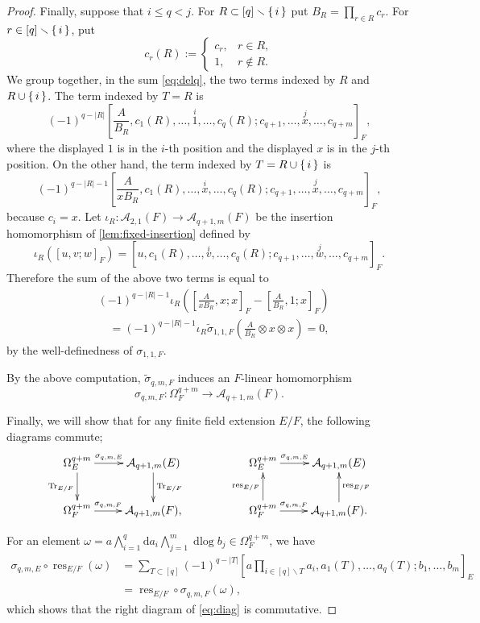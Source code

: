 \documentclass[a4paper,12pt,reqno]{amsart}
\numberwithin{equation}{section}
\theoremstyle{definition}
\DeclareMathOperator{\dlog}{dlog}
\DeclareMathOperator{\res}{res}
\DeclareMathOperator{\Tr}{Tr}
\renewcommand{\d}{\mathrm{d}}
\newcommand{\Acal}{\mathcal{A}}
\begin{document}
\begin{proof}
    Finally, suppose that $i\leq q<j$. 
    For $R\subset[q]\smallsetminus\set{i}$ put
	$B_R=\prod_{r\in R}c_r$.  
	For $r\in[q]\smallsetminus\set{i}$, put
\[
 c_r(R):=
 \begin{cases}
 c_r,&r\in R,\\
 1,&r\notin R.
 \end{cases}
\]
We group together, in the sum \eqref{eq:delq}, the two terms
indexed by
 $R$ and $R\cup \set{i}$.
The term indexed by $T=R$ is
\[
 (-1)^{q-|R|}
 \left[
 \frac{A}{B_R},
 c_1(R),\ldots,\overset{i}{1},\ldots,c_q(R);
 c_{q+1},\ldots,\overset{j}{x},\ldots,c_{q+m}
 \right]_F,
\]
where the displayed $1$ is in the $i$-th position and the
displayed $x$ is in the $j$-th position.
On the other hand, the term indexed by
$T=R\cup\set{i}$ is
\[
 (-1)^{q-|R|-1}
 \left[
 \frac{A}{xB_R},
 c_1(R),\ldots,\overset{i}{x},\ldots,c_q(R);
 c_{q+1},\ldots,\overset{j}x,\ldots,c_{q+m}
 \right]_F,
\]
because $c_i=x$.
Let $\iota_R:\Acal_{2,1}(F)\to\Acal_{q+1,m}(F)$
be the insertion homomorphism of
\autoref{lem:fixed-insertion} defined by
\[
 \iota_R([u,v;w]_F)
 =[u,c_1(R),\ldots,\overset{i}{v},\ldots,c_q(R); c_{q+1},\ldots,\overset{j}{w},\ldots,c_{q+m}]_F.
\]	
Therefore the sum of the above two terms is equal to
\begin{align*}
&(-1)^{q-|R|-1}
\iota_R
\left(
 \left[\frac{A}{xB_R},x;x\right]_F
 -
 \left[\frac{A}{B_R},1;x\right]_F
\right) \\
&\quad =(-1)^{q-|R|-1} \iota_R\widetilde \sigma_{1,1,F}
 \left(
 \frac{A}{B_R}\otimes x\otimes x
 \right) =0,
\end{align*}
by the well-definedness of $\sigma_{1,1,F}$. 

    By the above computation, $\widetilde \sigma_{q,m,F}$ induces an $F$-linear homomorphism
    \[
    \sigma_{q,m,F}:\Omega^{q+m}_F\to \Acal_{q+1,m}(F).
    \]


    Finally, we will show that for any finite field extension $E/F$, the following diagrams commute;
    \begin{align}\label{eq:diag}     
    \xymatrix{
    \Omega^{q+m}_E \ar[d]_{\Tr_{E/F}}\ar[r]^-{\sigma_{q,m,E}} &\Acal_{q+1,m}(E) \ar[d]^{\Tr_{E/F}} && \Omega^{q+m}_E \ar[r]^-{\sigma_{q,m,E}} &\Acal_{q+1,m}(E) \\
    \Omega^{q+m}_F \ar[r]^-{\sigma_{q,m,F}} &\Acal_{q+1,m}(F),&&\Omega^{q+m}_F \ar[u]^{\res_{E/F}}\ar[r]^-{\sigma_{q,m,F}} &\Acal_{q+1,m}(F)\ar[u]_{\res_{E/F}}.
    }
    \end{align}

    For an element $\omega=a\bigwedge_{i=1}^q\d a_i\bigwedge_{j=1}^m\dlog b_j\in \Omega^{q+m}_F$, we have
    \begin{align*}        
    \sigma_{q,m,E}\circ \res_{E/F}(\omega)
    &=\sum_{T\subset [q]}(-1)^{q-|T|}
    \left[
    a\prod_{i\in [q]\smallsetminus T}a_i,
    a_1(T),\ldots,a_q(T);b_1,\dots, b_m\right]_E\\
    &=\res_{E/F}\circ \sigma_{q,m,F}(\omega),
    \end{align*}
    which shows that the right diagram of \eqref{eq:diag} is commutative.


\end{proof}
\end{document}
